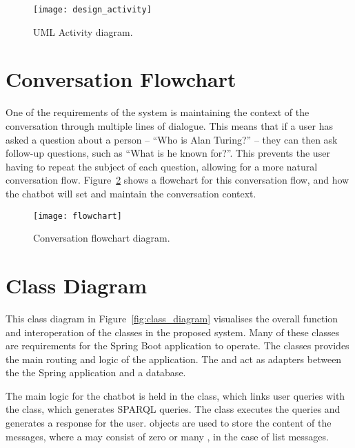 \begin{figure}[h]
	\begin{center}
		\texttt{[image: design\_activity]}
	\end{center}
	\caption{UML Activity diagram.}
	\label{fig:design_activity}
\end{figure}

\section{Conversation Flowchart}
One of the requirements of the system is maintaining the context of the conversation through multiple lines of dialogue. This means that if a user has asked a question about a person -- ``Who is Alan Turing?'' -- they can then ask follow-up questions, such as ``What is he known for?''. This prevents the user having to repeat the subject of each question, allowing for a more natural conversation flow. Figure~\ref{fig:flowchart} shows a flowchart for this conversation flow, and how the chatbot will set and maintain the conversation context.

\begin{figure}[h]
	\begin{center}
		\texttt{[image: flowchart]}
	\end{center}
	\caption{Conversation flowchart diagram.}
	\label{fig:flowchart}
\end{figure}

\section{Class Diagram}
This class diagram in Figure~\ref{fig:class_diagram} visualises the overall function and interoperation of the classes in the proposed system. Many of these classes are requirements for the Spring Boot application to operate. The  classes provides the main routing and logic of the application. The  and  act as adapters between the the Spring application and a database.

The main logic for the chatbot is held in the  class, which links user queries with the  class, which generates SPARQL queries. The  class executes the queries and generates a response for the user.  objects are used to store the content of the messages, where a  may consist of zero or many , in the case of list messages.

